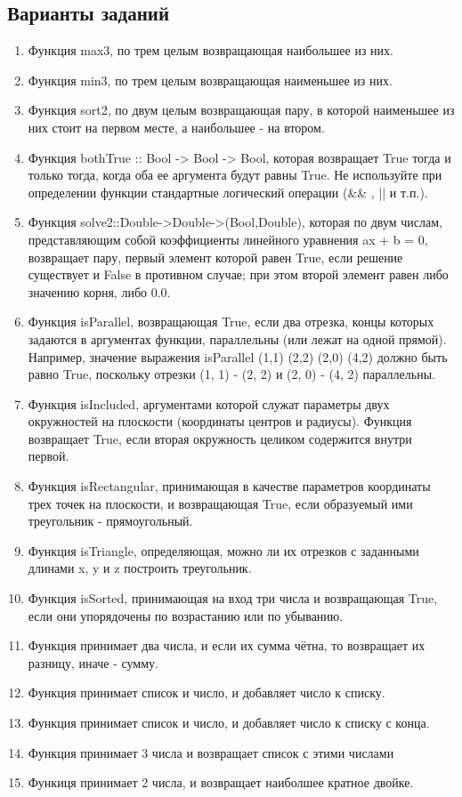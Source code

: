 \documentclass[a4paper,12pt]{article}
\begin{document}
\subsection{Варианты заданий}
\begin{enumerate}
	\item Функция max3, по трем целым возвращающая наибольшее из них.
	\item Функция min3, по трем целым возвращающая наименьшее из них.
	\item Функция sort2, по двум целым возвращающая пару, в которой наименьшее из них стоит на первом месте, а наибольшее - на втором.
	\item Функция bothTrue :: Bool -> Bool -> Bool, которая возвращает True тогда и только тогда, когда оба ее аргумента будут равны True. Не используйте при определении функции стандартные логический операции  (\&\& , || и т.п.).
	\item Функция     solve2::Double->Double->(Bool,Double), которая по двум числам, представляющим собой коэффициенты линейного уравнения ax + b = 0, возвращает пару, первый    элемент которой равен True, если решение существует и False в противном случае; при этом второй элемент равен либо значению корня, либо 0.0.
	\item Функция isParallel, возвращающая True, если два отрезка, концы которых задаются в аргументах функции, параллельны (или лежат на одной прямой). Например, значение выражения isParallel (1,1) (2,2) (2,0) (4,2) должно быть равно True, поскольку отрезки (1, 1) - (2, 2) и (2, 0) - (4, 2) параллельны.
	\item Функция isIncluded, аргументами которой служат параметры двух окружностей на плоскости (координаты центров и радиусы). Функция возвращает True, если вторая окружность целиком содержится внутри первой.
 	\item Функция isRectangular, принимающая в качестве параметров координаты трех точек на плоскости, и возвращающая True, если образуемый ими треугольник - прямоугольный.
	\item Функция isTriangle, определяющая, можно ли их отрезков с заданными длинами x, y и z построить треугольник.
	\item Функция isSorted, принимающая на вход три числа и возвращающая True, если они упорядочены по возрастанию или по убыванию.
	\item Функция принимает два числа, и если их сумма чётна, то возвращает их разницу, иначе - сумму.
	\item Функция принимает список и число, и добавляет число к списку.
	\item Функция принимает список и число, и добавляет число к списку с конца.
	\item Функция принимает 3 числа и возвращает список с этими числами
	\item Функиця принимает 2 числа, и возвращает наиболшее кратное двойке.
\end{enumerate}
\end{document}
